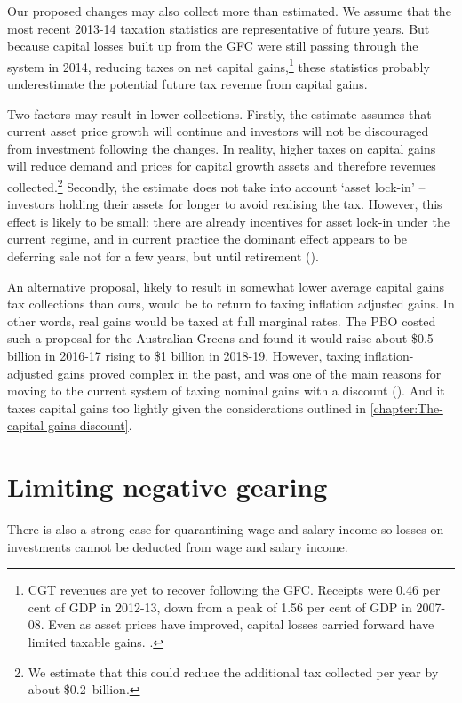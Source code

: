 Our proposed changes may also collect more than estimated. We assume that the most recent 2013-14 taxation statistics are representative of future years. But because capital losses built up from the GFC were still passing through the system in 2014, reducing taxes on net capital gains,\footnote{CGT revenues are yet to recover following the GFC. Receipts were 0.46 per cent of GDP in 2012-13, down from a peak of 1.56 per cent of GDP in 2007-08. Even as asset prices have improved, capital losses carried forward have limited taxable gains. \textcites{PBO2014TrendsAustralianGovtReceipts1982to2013}{StewartMooreWhitefordEtAl2015}.} these statistics probably underestimate the potential future tax revenue from capital gains. 

Two factors may result in lower collections. 
Firstly, the estimate assumes that current asset price growth will continue and investors will not be discouraged from investment following the changes. 
In reality, higher taxes on capital gains will reduce demand and prices for capital growth assets and therefore revenues collected.\footnote{We estimate that this could reduce the additional tax collected per year by about \$0.2~billion.} 
Secondly, the estimate does not take into account ‘asset lock-in’ – investors holding their assets for longer to avoid realising the tax. 
However, this effect is likely to be small: there are already incentives for asset lock-in under the current regime, and in current practice the dominant effect appears to be deferring sale not for a few years, but until retirement (). 

An alternative proposal, likely to result in somewhat lower average capital gains tax collections than ours, would be to return to taxing inflation adjusted gains.  
In other words, real gains would be taxed at full marginal rates. The PBO costed such a proposal for the Australian Greens and found it would raise about \$0.5 billion in 2016-17 rising to \$1 billion in 2018-19.  
However, taxing inflation-adjusted gains proved complex in the past, and was one of the main reasons for moving to the current system of taxing nominal gains with a discount (). 
And it taxes capital gains too lightly given the considerations outlined in \cref{chapter:The-capital-gains-discount}.

\section{Limiting negative gearing}
There is also a strong case for quarantining wage and salary income so losses on investments cannot be deducted from wage and salary income.
